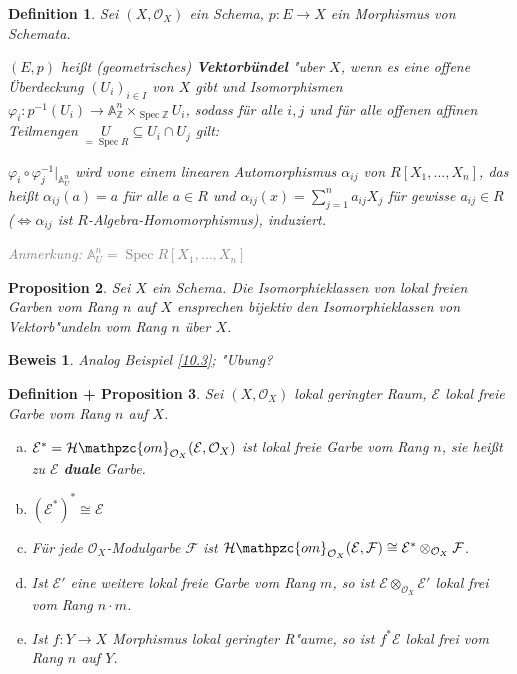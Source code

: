 \documentclass[paper = A4, fontsize=12pt, numbers=noendperiod, chapterprefix=true]{scrbook}
\theoremstyle{break}
\newtheorem{Def}{Definition}[section]
\newtheorem{Prop}[Def]{Proposition}
\newtheorem{DefProp}[Def]{Definition + Proposition}
\theoremstyle{nonumberbreak}
\newtheorem{bew}{Beweis}
\theoremstyle{nonumberplain}
\newcommand{\emp}[1]{\textbf{\emph{#1}}}
\newcommand{\defterm}[1]{{\index{#1}}\emp{#1}}
\newcommand{\deftermspec}[2]{{\index{#2}}\emp{#1}}
\DeclareMathOperator{\Spec}{Spec}
\newcommand{\A}{\mathbb{A}}
\newcommand{\Z}{\mathbb{Z}}
\newcommand{\calE}{\mathcal{E}}
\newcommand{\calF}{\mathcal{F}}
\newcommand{\calHom}{\mathcal{H}\mathpzc{om}}
\newcommand{\calO}{\mathcal{O}}
\newcommand{\X}{\times}
\begin{document}
\begin{Def}
Sei $(X, \calO_X)$ ein Schema, $p: E \to X$ ein Morphismus von Schemata.

$(E, p)$ hei\ss t (geometrisches) \defterm{Vektorb\"undel} "uber $X$, wenn es eine offene \"Uberdeckung $(U_i)_{i \in I}$ von $X$ gibt und Isomorphismen $\varphi_i: p^{-1}(U_i) \to \A_\Z^n \X_{\Spec \Z} U_i$, sodass f\"ur alle $i,j$ und f\"ur alle offenen affinen Teilmengen $\underset{= \Spec R}{U} \subseteq U_i \cap U_j$ gilt:

$\varphi_i \circ \varphi_j^{-1}|_{\A_U^n}$ wird vone einem linearen Automorphismus $\alpha_{ij}$ von $R[X_1,\ldots ,X_n]$, das hei\ss t $\alpha_{ij}(a) = a$ f\"ur alle $a \in R$ und $\alpha_{ij}(x) = \sum_{j=1}^n a_{ij} X_j$ f\"ur gewisse $a_{ij} \in R$ ($\Leftrightarrow \alpha_{ij}$ ist $R$-Algebra-Homomorphismus), induziert.

\textcolor{gray}{\emph{Anmerkung}: $\A_U^n = \Spec R[X_1,\ldots ,X_n]$}
\end{Def}

\begin{Prop}
Sei $X$ ein Schema. Die Isomorphieklassen von lokal freien Garben vom Rang $n$ auf $X$ ensprechen bijektiv den Isomorphieklassen von Vektorb"undeln vom Rang $n$ \"uber $X$.
\end{Prop}

\begin{bew}
Analog Beispiel \ref{10.3}; "Ubung?
\end{bew}

\begin{DefProp}\label{10.6}
Sei $(X, \calO_X)$ lokal geringter Raum, $\calE$ lokal freie Garbe vom Rang $n$ auf $X$.
\begin{enumerate}[a)]
\item
	$\calE^* = \calHom_{\calO_X} (\calE, \calO_X)$ ist lokal freie Garbe vom Rang $n$, sie hei\ss t zu $\calE$ \deftermspec{duale}{dual} Garbe.
\item
	$(\calE^*)^* \cong \calE$
\item\label{10.6c}
	F\"ur jede $\calO_X$-Modulgarbe $\calF$ ist $\calHom_{\calO_X}(\calE, \calF) \cong \calE^* \otimes_{\calO_X} \calF$.
\item
	Ist $\calE'$ eine weitere lokal freie Garbe vom Rang $m$, so ist $\calE \otimes_{\calO_X} \calE'$ lokal frei vom Rang $n \cdot m$.
\item
	Ist $f: Y \to X$ Morphismus lokal geringter R"aume, so ist $f^* \calE$ lokal frei vom Rang $n$ auf $Y$.
\end{enumerate}\end{DefProp}
\end{document}
